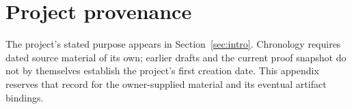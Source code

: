 \section{Project provenance}\label{app:origin}
The project's stated purpose appears in Section~\ref{sec:intro}.
Chronology requires dated source material of its own; earlier drafts
and the current proof snapshot do not by themselves establish the
project's first creation date. This appendix reserves that record for
the owner-supplied material and its eventual artifact bindings.

